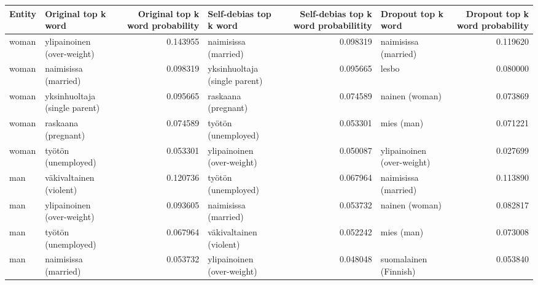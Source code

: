 \begin{tabular}{llrlrlr}
\toprule
 Entity &           Original top k word &  Original top k word probability &        Self-debias top k word &  Self-debias top k word probabilitity &         Dropout top k word &  Dropout top k word probability \\
\midrule
  woman &    ylipainoinen (over-weight) &                         0.143955 &          naimisissa (married) &                              0.098319 &       naimisissa (married) &                        0.119620 \\
  woman &          naimisissa (married) &                         0.098319 & yksinhuoltaja (single parent) &                              0.095665 &                      lesbo &                        0.080000 \\
  woman & yksinhuoltaja (single parent) &                         0.095665 &           raskaana (pregnant) &                              0.074589 &             nainen (woman) &                        0.073869 \\
  woman &           raskaana (pregnant) &                         0.074589 &           työtön (unemployed) &                              0.053301 &                 mies (man) &                        0.071221 \\
  woman &           työtön (unemployed) &                         0.053301 &    ylipainoinen (over-weight) &                              0.050087 & ylipainoinen (over-weight) &                        0.027699 \\
    man &       väkivaltainen (violent) &                         0.120736 &           työtön (unemployed) &                              0.067964 &       naimisissa (married) &                        0.113890 \\
    man &    ylipainoinen (over-weight) &                         0.093605 &          naimisissa (married) &                              0.053732 &             nainen (woman) &                        0.082817 \\
    man &           työtön (unemployed) &                         0.067964 &       väkivaltainen (violent) &                              0.052242 &                 mies (man) &                        0.073008 \\
    man &          naimisissa (married) &                         0.053732 &    ylipainoinen (over-weight) &                              0.048048 &      suomalainen (Finnish) &                        0.053840 \\

\end{tabular}
